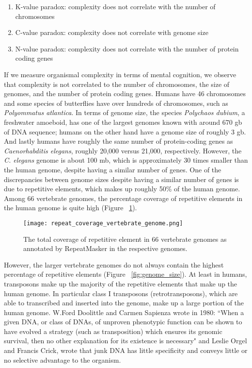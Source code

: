 \begin{enumerate}
   \item K-value paradox: complexity does not correlate with the number of chromosomes
   \item C-value paradox: complexity does not correlate with genome size
   \item N-value paradox: complexity does not correlate with the number of protein coding genes
\end{enumerate}

If we measure organismal complexity in terms of mental cognition, we observe that complexity is not correlated to the number of chromosomes, the size of genomes, and the number of protein coding genes. Humans have 46 chromosomes and some species of butterflies have over hundreds of chromosomes, such as \textit{Polyommatus atlantica}. In terms of genome size, the species \textit{Polychaos dubium}, a freshwater amoeboid, has one of the largest genomes known with around 670 gb of DNA sequence; humans on the other hand have a genome size of roughly 3 gb. And lastly humans have roughly the same number of protein-coding genes as \textit{Caenorhabditis elegans}, roughly 20,000 versus 21,000, respectively. However, the \textit{C. elegans} genome is about 100 mb\cite{celegans1998sequencing}, which is approximately 30 times smaller than the human genome, despite having a similar number of genes. One of the discrepancies between genome sizes despite having a similar number of genes is due to repetitive elements, which makes up roughly 50\% of the human genome. Among 66 vertebrate genomes, the percentage coverage of repetitive elements in the human genome is quite high (Figure ~\ref{fig:repeat_coverage_vertebrate_genome}).

\begin{figure}[h]
   \centering
   \texttt{[image: repeat\_coverage\_vertebrate\_genome.png]}
   \caption[Coverage of repetitive elements in vertebrate genomes]{The total coverage of repetitive element in 66 vertebrate genomes as annotated by RepeatMasker in the respective genomes\cite{tang2014repcoverage}.}
   \label{fig:repeat_coverage_vertebrate_genome}
\end{figure}

However, the larger vertebrate genomes do not always contain the highest percentage of repetitive elements (Figure ~\ref{fig:genome_size}). At least in humans, transposons make up the majority of the repetitive elements that make up the human genome. In particular class I transposons (retrotransposons), which are able to transcribed and inserted into the genome, make up a large portion of the human genome. W.Ford Doolittle and Carmen Sapienza wrote in 1980\cite{doolittle1980selfish}: ``When a given DNA, or class of DNAs, of unproven phenotypic function can be shown to have evolved a strategy (such as transposition) which ensures its genomic survival, then no other explanation for its existence is necessary" and Leslie Orgel and Francis Crick, wrote that junk DNA has little specificity and conveys little or no selective advantage to the organism\cite{orgel1980selfish}.

